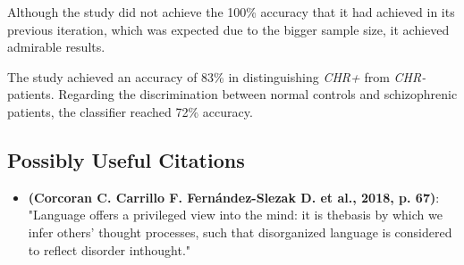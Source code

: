\documentclass{Paper_Summary}
\begin{document}
    Although the study did not achieve the 100\% accuracy that it had achieved in its previous iteration, which was expected due to the bigger sample size, it achieved admirable results.

    The study achieved an accuracy of 83\% in distinguishing \emph{CHR+} from \emph{CHR-} patients. Regarding the discrimination between normal controls and schizophrenic patients, the classifier reached 72\% accuracy.

\breakline

\begin{center}
    \section*{Possibly Useful Citations}
\end{center}

    \begin{itemize}
        \item \textbf{(Corcoran C. Carrillo F. Fernández-Slezak D. et al., 2018, p. 67)}: "Language offers a privileged view into the mind: it is thebasis by which we infer others’ thought processes, such that disorganized language is considered to reflect disorder inthought."
    \end{itemize}
\end{document}
